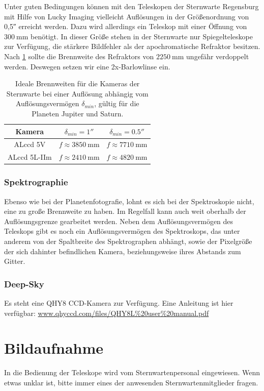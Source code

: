 \documentclass[10pt,a4paper,titlepage]{article}
\begin{document}
Unter guten Bedingungen können mit den Teleskopen der Sternwarte Regensburg mit Hilfe von Lucky Imaging vielleicht Auflösungen in der Größenordnung von \ang{;;0,5} erreicht werden. Dazu wird allerdings ein Teleskop mit einer Öffnung von $\SI{300}{\mm}$ benötigt. In dieser Größe stehen in der Sternwarte nur Spiegelteleskope zur Verfügung, die stärkere Bildfehler als der apochromatische Refraktor besitzen.
Nach \ref{tbl:kamerabrennweiten} sollte die Brennweite des Refraktors von $\SI{2250}{\mm}$ ungefähr verdoppelt werden. Deswegen setzen wir eine 2x-Barlowlinse ein.

\begin{table}
\begin{center}
\begin{tabular}{|c|c|c|}
\hline
Kamera & $\delta_{min} = \ang{;;1}$ & $\delta_{min} = \ang{;;0.5}$\\
\hline
ALccd 5V & $f \approx \SI{3850}{\mm}$ & $f \approx \SI{7710}{\mm}$\\
ALccd 5L-IIm & $f \approx \SI{2410}{\mm}$ & $f \approx \SI{4820}{\mm}$ \\
\hline
\end{tabular}
\caption{Ideale Brennweiten für die Kameras der Sternwarte bei einer Auflösung abhängig vom Auflösungsvermögen $\delta_{min}$, gültig für die Planeten Jupiter und Saturn.}
\label{tbl:kamerabrennweiten}
\end{center}
\end{table}

\subsubsection{Spektrographie}
Ebenso wie bei der Planetenfotografie, lohnt es sich bei der Spektroskopie nicht, eine zu große Brennweite zu haben. Im Regelfall kann auch weit oberhalb der Auflösungsgrenze gearbeitet werden. Neben dem Auflösungsvermögen des Teleskops gibt es noch ein Auflösungsvermögen des Spektroskops, das unter anderem von der Spaltbreite des Spektrographen abhängt, sowie der Pixelgröße der sich dahinter befindlichen Kamera, beziehungsweise ihres Abstands zum Gitter.

\subsubsection{Deep-Sky}
Es steht eine QHY8 CCD-Kamera zur Verfügung. Eine Anleitung ist hier verfügbar: \url{www.qhyccd.com/files/QHY8L\%20user\%20manual.pdf}

\section{Bildaufnahme}
In die Bedienung der Teleskope wird vom Sternwartenpersonal eingewiesen. Wenn etwas unklar ist, bitte immer eines der anwesenden Sternwartenmitglieder fragen.
\end{document}
